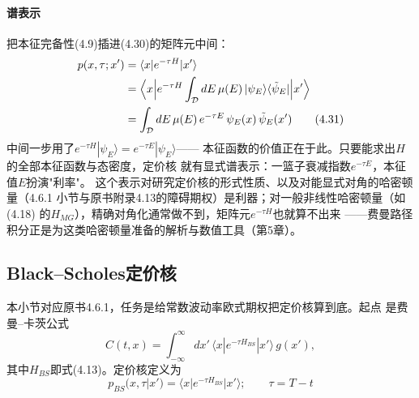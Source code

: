 \paragraph{谱表示}
把本征完备性(4.9)插进(4.30)的矩阵元中间：
\begin{align*}
p(x,\tau;x')
&=\langle x|e^{-\tau H}|x'\rangle\\
&=\Bigl\langle x\Bigl|e^{-\tau H}
\int_{\mathcal{D}}dE\,\mu(E)\,|\psi_{E}\rangle\langle\tilde{\psi}_{E}|
\Bigr|x'\Bigr\rangle\\
&=\int_{\mathcal{D}}dE\,\mu(E)\,e^{-\tau E}\,
\psi_{E}(x)\,\tilde{\psi}_{E}(x')
\tag{4.31}
\end{align*}
中间一步用了$e^{-\tau H}|\psi_{E}\rangle=e^{-\tau E}|\psi_{E}\rangle$——
本征函数的价值正在于此。只要能求出$H$的全部本征函数与态密度，定价核
就有显式谱表示：一篮子衰减指数$e^{-\tau E}$，本征值$E$扮演"利率"。
这个表示对研究定价核的形式性质、以及对能显式对角的哈密顿量（4.6.1
小节与原书附录4.13的障碍期权）是利器；对一般非线性哈密顿量（如(4.18)
的$H_{MG}$），精确对角化通常做不到，矩阵元$e^{-\tau H}$也就算不出来
——费曼路径积分正是为这类哈密顿量准备的解析与数值工具（第5章）。

\subsection{Black--Scholes定价核}

本小节对应原书4.6.1，任务是给常数波动率欧式期权把定价核算到底。起点
是费曼--卡茨公式
\begin{equation*}
C(t,x)=\int_{-\infty}^{\infty}dx'\,
\langle x|e^{-\tau H_{BS}}|x'\rangle\,g(x'),
\end{equation*}
其中$H_{BS}$即式(4.13)。定价核定义为
\begin{equation*}
p_{BS}(x,\tau|x')=\langle x|e^{-\tau H_{BS}}|x'\rangle
;\qquad \tau=T-t
\tag{4.32}
\end{equation*}

